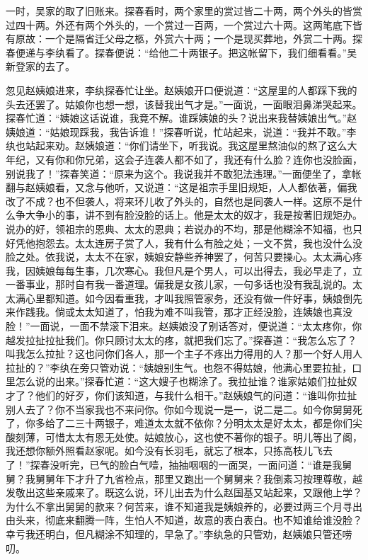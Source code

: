 \begin{parag}


    一时，吴家的取了旧账来。探春看时，两个家里的赏过皆二十两，两个外头的皆赏过四十两。外还有两个外头的，一个赏过一百两，一个赏过六十两。这两笔底下皆有原故：一个是隔省迁父母之柩，外赏六十两；一个是现买葬地，外赏二十两。探春便递与李纨看了。探春便说：“给他二十两银子。把这帐留下，我们细看看。”吴新登家的去了。
\end{parag}


\begin{parag}


    忽见赵姨娘进来，李纨探春忙让坐。赵姨娘开口便说道：“这屋里的人都踩下我的头去还罢了。姑娘你也想一想，该替我出气才是。”一面说，一面眼泪鼻涕哭起来。探春忙道：“姨娘这话说谁，我竟不解。谁踩姨娘的头？说出来我替姨娘出气。”赵姨娘道：“姑娘现踩我，我告诉谁！”探春听说，忙站起来，说道：“我并不敢。”李纨也站起来劝。赵姨娘道：“你们请坐下，听我说。我这屋里熬油似的熬了这么大年纪，又有你和你兄弟，这会子连袭人都不如了，我还有什么脸？连你也没脸面，别说我了！”探春笑道：“原来为这个。我说我并不敢犯法违理。”一面便坐了，拿帐翻与赵姨娘看，又念与他听，又说道：“这是祖宗手里旧规矩，人人都依著，偏我改了不成？也不但袭人，将来环儿收了外头的，自然也是同袭人一样。这原不是什么争大争小的事，讲不到有脸没脸的话上。他是太太的奴才，我是按著旧规矩办。说办的好，领祖宗的恩典、太太的恩典；若说办的不均，那是他糊涂不知福，也只好凭他抱怨去。太太连房子赏了人，我有什么有脸之处；一文不赏，我也没什么没脸之处。依我说，太太不在家，姨娘安静些养神罢了，何苦只要操心。太太满心疼我，因姨娘每每生事，几次寒心。我但凡是个男人，可以出得去，我必早走了，立一番事业，那时自有我一番道理。偏我是女孩儿家，一句多话也没有我乱说的。太太满心里都知道。如今因看重我，才叫我照管家务，还没有做一件好事，姨娘倒先来作践我。倘或太太知道了，怕我为难不叫我管，那才正经没脸，连姨娘也真没脸！”一面说，一面不禁滚下泪来。赵姨娘没了别话答对，便说道：“太太疼你，你越发拉扯拉扯我们。你只顾讨太太的疼，就把我们忘了。”探春道：“我怎么忘了？叫我怎么拉扯？这也问你们各人，那一个主子不疼出力得用的人？那一个好人用人拉扯的？”李纨在旁只管劝说：“姨娘别生气。也怨不得姑娘，他满心里要拉扯，口里怎么说的出来。”探春忙道：“这大嫂子也糊涂了。我拉扯谁？谁家姑娘们拉扯奴才了？他们的好歹，你们该知道，与我什么相干。”赵姨娘气的问道：“谁叫你拉扯别人去了？你不当家我也不来问你。你如今现说一是一，说二是二。如今你舅舅死了，你多给了二三十两银子，难道太太就不依你？分明太太是好太太，都是你们尖酸刻薄，可惜太太有恩无处使。姑娘放心，这也使不著你的银子。明儿等出了阁，我还想你额外照看赵家呢。如今没有长羽毛，就忘了根本，只拣高枝儿飞去了！”探春没听完，已气的脸白气噎，抽抽咽咽的一面哭，一面问道：“谁是我舅舅？我舅舅年下才升了九省检点，那里又跑出一个舅舅来？我倒素习按理尊敬，越发敬出这些亲戚来了。既这么说，环儿出去为什么赵国基又站起来，又跟他上学？为什么不拿出舅舅的款来？何苦来，谁不知道我是姨娘养的，必要过两三个月寻出由头来，彻底来翻腾一阵，生怕人不知道，故意的表白表白。也不知谁给谁没脸？幸亏我还明白，但凡糊涂不知理的，早急了。”李纨急的只管劝，赵姨娘只管还唠叨。
\end{parag}


